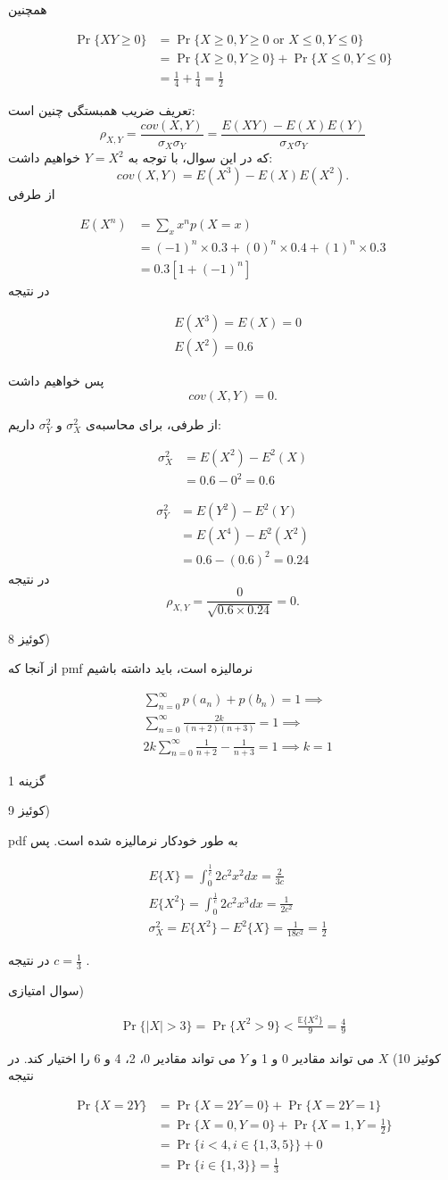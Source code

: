 \documentclass[10pt,letterpaper]{report}
\newcommand{\eqn}[1]{
\[\begin{split}
#1
\end{split}\]
}
\begin{document}
همچنین
\eqn{
\Pr\{XY\ge 0\}&=\Pr\{X\ge 0,Y\ge 0\text{ or }X\le 0,Y\le 0\}
\\&=
\Pr\{X\ge 0,Y\ge 0\}+\Pr\{X\le 0,Y\le 0\}
\\&=\frac{1}{4}+\frac{1}{4}=\frac{1}{2}
}

تعریف ضریب همبستگی چنین است:
$$
\rho_{X,Y}=\frac{cov(X,Y)}{\sigma_X\sigma_Y}=\frac{E(XY)-E(X)E(Y)}{\sigma_X\sigma_Y}
$$
که در این سوال، با توجه به 
$
Y=X^2
$
خواهیم داشت:
$$
cov(X,Y)=E(X^3)-E(X)E(X^2).
$$
از طرفی
\eqn{
E(X^n)&=\sum_x x^np(X=x)\\&=
(-1)^n\times 0.3+
(0)^n\times 0.4+
(1)^n\times 0.3
\\&=0.3[1+(-1)^n]
}{}
در نتیجه
\eqn{
&
E(X^3)=E(X)=0
\\&E(X^2)=0.6
}
پس خواهیم داشت
$$
cov(X,Y)=0.
$$

از طرفی، برای محاسبه‌ی 
$
\sigma_X^2
$
و
$
\sigma_Y^2
$
داریم:
\eqn{
\sigma_X^2&=E(X^2)-E^2(X)
\\&=0.6-0^2=0.6
}{}
\eqn{
\sigma_Y^2&=E(Y^2)-E^2(Y)
\\&=E(X^4)-E^2(X^2)
\\&=0.6-(0.6)^2=0.24
}{}
در نتیجه
$$
\rho_{X,Y}=\frac{0}{\sqrt{0.6\times 0.24}}=0.
$$

کوئیز 8)

از آنجا که pmf نرمالیزه است، باید داشته باشیم
\eqn{
&\sum_{n=0}^\infty p(a_n)+p(b_n)=1
\implies
\\&\sum_{n=0}^\infty \frac{2k}{(n+2)(n+3)}=1
\implies
\\&2k\sum_{n=0}^\infty \frac{1}{n+2}-\frac{1}{n+3}=1
\implies k=1
}

گزینه 1

کوئیز 9)

pdf به طور خودکار نرمالیزه شده است. پس
\eqn{
&E\{X\}=\int_0^\frac{1}{c}2c^2x^2dx=\frac{2}{3c}
\\&
E\{X^2\}=\int_0^\frac{1}{c}2c^2x^3dx=\frac{1}{2c^2}
\\&
\sigma_X^2=E\{X^2\}-E^2\{X\}=\frac{1}{18c^2}=\frac{1}{2}
}
در نتیجه
$
c=\frac{1}{3}
$
.

سوال امتیازی)
\eqn{
\Pr\{|X|>3\}=\Pr\{X^2>9\}<\frac{\mathbb{E}\{X^2\}}{9}=\frac{4}{9}
}

کوئیز 10)
$
X
$
می تواند مقادیر 0 و 1 و 
$
Y
$
می تواند مقادیر 0، 2، 4 و 6 را اختیار کند. در نتیجه
\eqn{
\Pr\{X=2Y\}&=\Pr\{X=2Y=0\}+\Pr\{X=2Y=1\}
\\&=\Pr\{X=0,Y=0\}+\Pr\{X=1,Y=\frac{1}{2}\}
\\&=\Pr\{i<4,i\in\{1,3,5\}\}+0
\\&=\Pr\{i\in\{1,3\}\}=\frac{1}{3}
}
\end{document}
